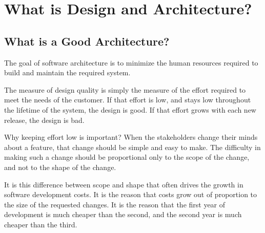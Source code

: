 
\chapter{What is Design and Architecture?}

\section{What is a Good Architecture?}

\begin{marker}
The goal of software architecture is to minimize the human resources required to build and maintain the required system.
\end{marker}

The measure of design quality is simply the measure of the effort required to meet
the needs of the customer. If that effort is low, and stays low throughout the lifetime of the system, the design is good. If that effort grows with each new release, the design is bad.

Why keeping effort low is important? When the stakeholders change their minds about a feature, that change should be simple and easy to make. The difficulty in making such a change should be proportional only to the scope of the change, and not to the shape of the change.

It is this difference between scope and shape that often drives the growth in software development costs. It is the reason that costs grow out of proportion to the size of the requested changes. It is the reason that the first year of development is much cheaper than the second, and the second year is much cheaper than the third.

